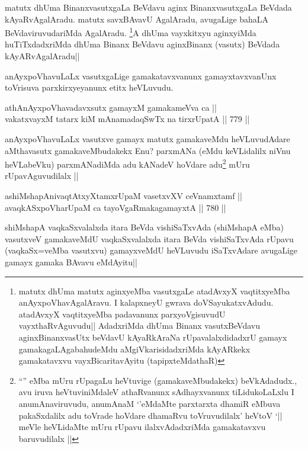 \begin{artha}
matutx dhUma BinanxvasutxgaLa BeVdavu aginx BinanxvasutxgaLa BeVdada kAyaRvAgalAradu. matutx savxBAvavU AgalAradu, avugaLige bahaLA BeVdaviruvudariMda AgalAradu. \footnote{matutx dhUma matutx aginxyeMba vasutxgaLe atadAvxyX vaqtitxyeMba anAyxpoVhavAgalAravu. I kalapxneyU gwrava doVSayukatxvAdudu. atadAvxyX vaqtitxyeMba padavanunx parxyoVgisuvudU vayxthaRvAguvudu|| AdadxriMda dhUma Binanx vasutxBeVdavu aginxBinanxvasUtx beVdavU kAyaRkAraNa rUpavalalxdidadxrU gamayx gamakagaLAgabahudeMdu aMgiVkarisidadxriMda kAyARkekx gamakatavxvu vayxBicaritavAyitu (tapipxteMdathaR)}A dhUma vayxkitxyu aginxyiMda huTiTxdadxriMda dhUma Binanx BeVdavu aginxBinanx (vasutx) BeVdada kAyARvAgalAradu||
\end{artha}

\begin{artha}
anAyxpoVhavuLaLx vasutxgaLige gamakatavxvanunx gamayxtavxvanUnx toVrisuva parxkirxyeyanunx etitx heVLuvudu.
\end{artha}

\begin{shl}
athAnAyxpoVhavadavxsutx gamayxM gamakameVva ca || \\
vakatxvayxM tatarx kiM mAnamadaqSwTx na tirxrUpatA ||  779 ||  
\end{shl}

\begin{artha}
anAyxpoVhavuLaLx vasutxve gamayx matutx gamakaveMdu heVLuvudAdare aMthavasutx gamakaveMbudakekx Enu? parxmANa (eMdu keVLidalilx niVnu heVLabeVku) parxmANadiMda adu kANadeV hoVdare adu\footnote{``\stext'' eMba mUru rUpagaLu heVtuvige (gamakaveMbudakekx) beVkAdadudx., avu iruva heVtuviniMdaleV athaRvanunx sAdhayxvanunx tiLidukoLaLxlu I anumAnaviruvudu, anumAnaM `\stext'eMdaMte parxtarxta dhamiR eMbuva pakaSxdalilx adu toVrade hoVdare dhamaRvu toVruvudilalx' heVtoV `\stext \stext || meVle heVLidaMte mUru rUpavu ilalxvAdadxriMda gamakatavxvu baruvudilalx ||} mUru rUpavAguvudilalx ||
\end{artha}

\begin{shl}
ashiMshapAnivaqtAtxyXtamxrUpaM vasetxvXV ceVnamxtamf || \\
avaqkASxpoVharUpaM ca tayoVgaRmakagamayxtA ||  780 ||  
\end{shl}

\begin{artha}
shiMshapA vaqkaSxvalalxda itara BeVda vishiSaTxvAda (shiMshapA eMba) vasutxveV gamakaveMdU vaqkaSxvalalxda itara BeVda vishiSaTxvAda rUpavu (vaqkaSx=veMba vasutxvu) gamayxveMdU heVLuvudu iSaTxvAdare avugaLige gamayx gamaka BAvavu eMdAyitu||
\end{artha}

